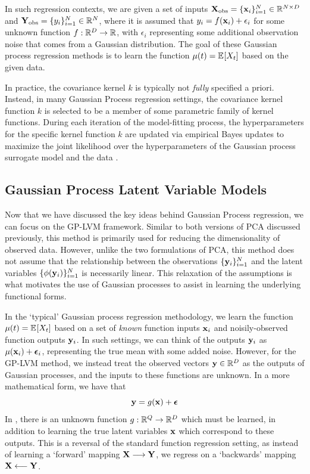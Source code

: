 \documentclass[12pt]{article}
\numberwithin{equation}{section}
\numberwithin{figure}{section}
\numberwithin{table}{section}
\begin{document}
In such regression contexts, we are given a set of inputs $\mathbf{X}_{\text{obs}} = \{\mathbf{x}_{i}\}_{i=1}^{N} \in \mathbb{R}^{N \times D}$ and $\mathbf{Y}_{\text{obs}} = \{y_{i}\}_{i=1}^{N} \in \mathbb{R}^{N}$, where it is assumed that $y_{i} = f(\mathbf{x}_{i}) + \epsilon_{i}$ for some unknown function $f: \mathbb{R}^{D} \to \mathbb{R}$, with $\epsilon_{i}$ representing some additional observation noise that comes from a Gaussian distribution. The goal of these Gaussian process regression methods is to learn the function $\mu(t) = \expec{X_{t}}$ based on the given data. 

In practice, the covariance kernel $k$ is typically not \emph{fully} specified a priori. Instead, in many Gaussian Process regression settings, the covariance kernel function $k$ is selected to be a member of some parametric family of kernel functions. During each iteration of the model-fitting process, the hyperparameters for the specific kernel function $k$ are updated via empirical Bayes updates to maximize the joint likelihood over the hyperparameters of the Gaussian process surrogate model and the data \citep{Rasmussen-GPML-2006}.

\subsection{Gaussian Process Latent Variable Models}

Now that we have discussed the key ideas behind Gaussian Process regression, we can focus on the GP-LVM framework. Similar to both versions of PCA discussed previously, this method is primarily used for reducing the dimensionality of observed data. However, unlike the two formulations of PCA, this method does not assume that the relationship between the observations $\{\mathbf{y}_{i}\}_{i=1}^{N}$ and the latent variables $\{\phi(\mathbf{y}_{i})\}_{i=1}^{N}$ is necessarily linear. This relaxation of the assumptions is what motivates the use of Gaussian processes to assist in learning the underlying functional forms.

In the `typical' Gaussian process regression methodology, we learn the function $\mu(t) = \expec{X_{t}}$ based on a set of \emph{known} function inputs $\mathbf{x}_{i}$ and noisily-observed function outputs $\mathbf{y}_{i}$. In such settings, we can think of the outputs $\mathbf{y}_{i}$ as $\mu(\mathbf{x}_{i}) + \bm{\epsilon}_{i}$, representing the true mean with some added noise. However, for the GP-LVM method, we instead treat the observed vectors $\mathbf{y} \in \mathbb{R}^{D}$ as the outputs of Gaussian processes, and the inputs to these functions are unknown. In a more mathematical form, we have that
\begin{equation}
    \mathbf{y} = g(\mathbf{x}) + \bm{\epsilon} \label{eq:GPLVM-model-simple}
\end{equation} 
In , there is an unknown function $g: \mathbb{R}^{Q} \to \mathbb{R}^{D}$ which must be learned, in addition to learning the true latent variables $\mathbf{x}$ which correspond to these outputs. This is a reversal of the standard function regression setting, as instead of learning a `forward' mapping $\mathbf{X} \longrightarrow \mathbf{Y}$, we regress on a `backwards' mapping $\mathbf{X} \longleftarrow \mathbf{Y}$. \citep{GPLVM-Viz-2004,Bayes-GPLVM-2010}
\end{document}
